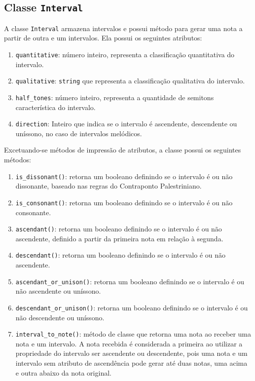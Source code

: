     \subsection[Classe \texttt{Interval}]{Classe \texttt{Interval}}

      A classe \texttt{Interval} armazena intervalos e possui método para gerar uma nota a partir de outra e um intervalos. Ela possui os seguintes atributos:

      \begin{enumerate}
        \item \texttt{quantitative}: número inteiro, representa a classificação quantitativa do intervalo.
        \item \texttt{qualitative}: \texttt{string} que representa a classificação qualitativa do intervalo.
        \item \texttt{half\_tones}: número inteiro, representa a quantidade de semitons característica do intervalo.
        \item \texttt{direction}: Inteiro que indica se o intervalo é ascendente, descendente ou uníssono, no caso de intervalos melódicos.
      \end{enumerate}

      Excetuando-se métodos de impressão de atributos, a classe possui os seguintes métodos:

      \begin{enumerate}
        \item \texttt{is\_dissonant()}: retorna um booleano definindo se o intervalo é ou não dissonante, baseado nas regras do Contraponto Palestriniano.
        \item \texttt{is\_consonant()}: retorna um booleano definindo se o intervalo é ou não consonante.
        \item \texttt{ascendant()}: retorna um booleano definindo se o intervalo é ou não ascendente, definido a partir da primeira nota em relação à segunda.
        \item \texttt{descendant()}: retorna um booleano definindo se o intervalo é ou não ascendente.
        \item \texttt{ascendant\_or\_unison()}: retorna um booleano definindo se o intervalo é ou não ascendente ou uníssono.
        \item \texttt{descendant\_or\_unison()}: retorna um booleano definindo se o intervalo é ou não descendente ou uníssono.
        \item \texttt{interval\_to\_note()}: método de classe que retorna uma nota ao receber uma nota e um intervalo. A nota recebida é considerada a primeira ao utilizar a propriedade do intervalo ser ascendente ou descendente, pois uma nota e um intervalo sem atributo de ascendência pode gerar até duas notas, uma acima e outra abaixo da nota original.
      \end{enumerate}

